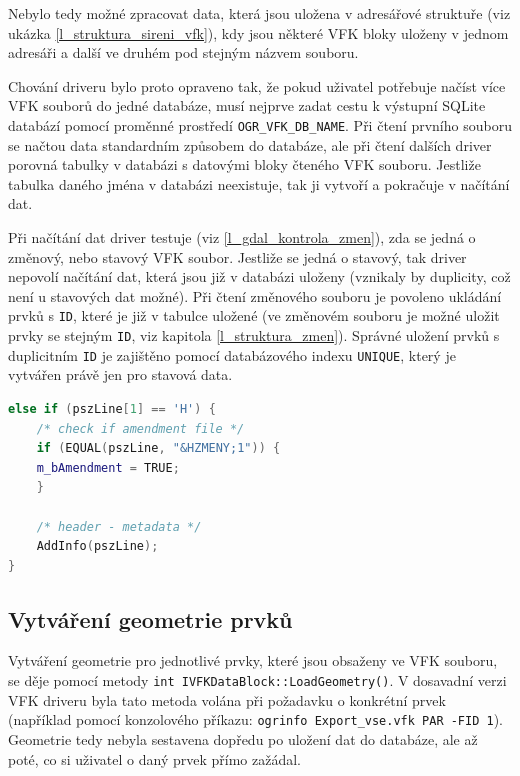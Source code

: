 \documentclass[a4paper,12pt,oneside]{book}
\begin{document}
Nebylo tedy možné zpracovat data, která jsou uložena v adresářové struktuře (viz ukázka \ref{l_struktura_sireni_vfk}), kdy jsou některé VFK bloky uloženy v jednom adresáři a další ve druhém pod stejným názvem souboru.

Chování driveru bylo proto opraveno tak, že pokud uživatel potřebuje načíst více VFK souborů do jedné databáze, musí nejprve zadat cestu k výstupní SQLite databází pomocí proměnné prostředí \texttt{OGR\_VFK\_DB\_NAME}. Při čtení prvního souboru se načtou data standardním způsobem do databáze, ale při čtení dalších driver porovná tabulky v databázi s datovými bloky čteného VFK souboru. Jestliže tabulka daného jména v databázi neexistuje, tak ji vytvoří a pokračuje v načítání dat. 

Při načítání dat driver testuje (viz \ref{l_gdal_kontrola_zmen}), zda se jedná o změnový, nebo stavový VFK soubor. Jestliže se jedná o stavový, tak driver nepovolí načítání dat, která jsou již v databázi uloženy (vznikaly by duplicity, což není u stavových dat možné). Při čtení změnového souboru je povoleno ukládání prvků s \texttt{ID}, které je již v tabulce uložené (ve změnovém souboru je možné uložit prvky se stejným \texttt{ID}, viz kapitola \ref{l_struktura_zmen}). Správné uložení prvků s duplicitním \texttt{ID} je zajištěno pomocí databázového indexu \texttt{UNIQUE}, který je vytvářen právě jen pro stavová data.

\begin{lstlisting}[language=C++, 
		    caption={Výňatek z kódu pro kontrolu změnového souboru}, 
		    keywordstyle=\color{blue}\ttfamily,
		    stringstyle=\color{red}\ttfamily,
		    commentstyle=\color{green}\ttfamily, 
		    morekeywords={AddInfo, EQUAL},
		    label=l_gdal_kontrola_zmen]
else if (pszLine[1] == 'H') {
    /* check if amendment file */
    if (EQUAL(pszLine, "&HZMENY;1")) {
	m_bAmendment = TRUE;
    }

    /* header - metadata */
    AddInfo(pszLine);
}
\end{lstlisting}

\subsection{Vytváření geometrie prvků}
Vytváření geometrie pro jednotlivé prvky, které jsou obsaženy ve VFK souboru, se děje pomocí metody \texttt{int IVFKDataBlock::LoadGeometry()}. V dosavadní verzi VFK driveru byla tato metoda volána při požadavku o konkrétní prvek (například pomocí konzolového příkazu: \texttt{ogrinfo Export\_vse.vfk PAR -FID 1}). Geometrie tedy nebyla sestavena dopředu po uložení dat do databáze, ale až poté, co si uživatel o daný prvek přímo zažádal.
\end{document}
